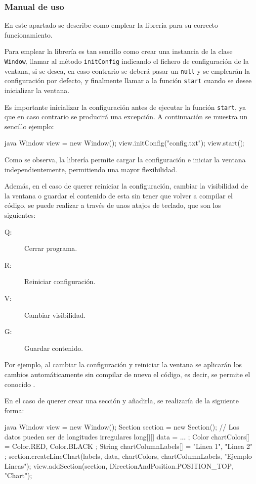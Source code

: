 \subsubsection{Manual de uso}

En este apartado se describe como emplear la librería para su correcto funcionamiento.\bigskip

Para emplear la librería es tan sencillo como crear una instancia de la clase \texttt{Window}, llamar al método \texttt{initConfig} indicando el fichero de configuración de la ventana, si se desea, en caso contrario se deberá pasar un \texttt{null} y se emplearán la configuración por defecto, y finalmente llamar a la función \texttt{start} cuando se desee inicializar la ventana.\bigskip

Es importante inicializar la configuración antes de ejecutar la función \texttt{start}, ya que en caso contrario se producirá una excepción. A continuación se muestra un sencillo ejemplo:

\begin{code}{\scriptsize}{java}
Window view = new Window(); 
view.initConfig("config.txt"); 
view.start(); 
\end{code}

Como se observa, la librería permite cargar la configuración e iniciar la ventana independientemente, permitiendo una mayor flexibilidad.\bigskip

Además, en el caso de querer reiniciar la configuración, cambiar la visibilidad de la ventana o guardar el contenido de esta sin tener que volver a compilar el código, se puede realizar a través de unos atajos de teclado, que son los siguientes:\medskip

\begin{description}
    \item[Q:] Cerrar programa.
    \item[R:] Reiniciar configuración.
    \item[V:] Cambiar visibilidad.
    \item[G:] Guardar contenido.
\end{description}\bigskip

Por ejemplo, al cambiar la configuración y reiniciar la ventana se aplicarán los cambios automáticamente sin compilar de nuevo el código, es decir, se permite el conocido .\bigskip

En el caso de querer crear una sección y añadirla, se realizaría de la siguiente forma:

\begin{code}{\scriptsize}{java}
Window view = new Window(); 
Section section = new Section();
// Los datos pueden ser de longitudes irregulares
long[][] data = { ... }; 
Color chartColors[] = { Color.RED, Color.BLACK };
String chartColumnLabels[] = { "Linea 1",
                               "Linea 2" };
section.createLineChart(labels, 
                        data, 
                        chartColors, 
                        chartColumnLabels, 
                        "Ejemplo Lineas");
view.addSection(section, 
                DirectionAndPosition.POSITION_TOP, 
                "Chart");
\end{code}

